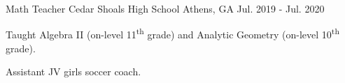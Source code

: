 \begin{cventries}
\vspace{6mm}

   \cventry
	{Math Teacher} %
	{Cedar Shoals High School} %
	{Athens, GA} %
	{Jul. 2019 - Jul. 2020} %
	{
		\begin{cvitems} %
			\item {Taught Algebra II (on-level 11\textsuperscript{th} grade) and Analytic Geometry (on-level 10\textsuperscript{th} grade).}
			\item {Assistant JV girls soccer coach.}
		\end{cvitems}
	}
	
\vspace{6mm}





\end{cventries}

